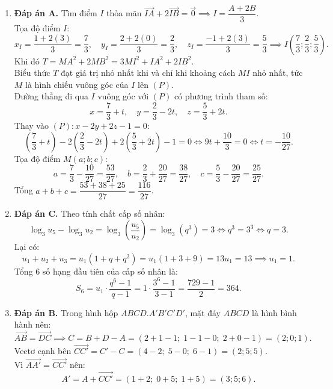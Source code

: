 \documentclass[12pt,a4paper]{article}
\begin{document}
\begin{enumerate}[label=\textbf{Câu \arabic*:}, leftmargin=*]
\item \textbf{Đáp án A.}
Tìm điểm $I$ thỏa mãn $\overrightarrow{IA} + 2\overrightarrow{IB} = \vec{0} \implies I = \dfrac{A + 2B}{3}$.\\
Tọa độ điểm $I$:
$$x_I = \dfrac{1 + 2(3)}{3} = \dfrac{7}{3},\quad y_I = \dfrac{2 + 2(0)}{3} = \dfrac{2}{3},\quad z_I = \dfrac{-1 + 2(3)}{3} = \dfrac{5}{3} \implies I\left(\dfrac{7}{3}; \dfrac{2}{3}; \dfrac{5}{3}\right).$$
Khi đó $T = MA^2 + 2MB^2 = 3MI^2 + IA^2 + 2IB^2$.\\
Biểu thức $T$ đạt giá trị nhỏ nhất khi và chỉ khi khoảng cách $MI$ nhỏ nhất, tức $M$ là hình chiếu vuông góc của $I$ lên $(P)$.\\
Đường thẳng đi qua $I$ vuông góc với $(P)$ có phương trình tham số:
$$x = \dfrac{7}{3} + t,\quad y = \dfrac{2}{3} - 2t,\quad z = \dfrac{5}{3} + 2t.$$
Thay vào $(P): x - 2y + 2z - 1 = 0$:
$$\left(\dfrac{7}{3} + t\right) - 2\left(\dfrac{2}{3} - 2t\right) + 2\left(\dfrac{5}{3} + 2t\right) - 1 = 0 \iff 9t + \dfrac{10}{3} = 0 \iff t = -\dfrac{10}{27}.$$
Tọa độ điểm $M(a; b; c)$:
$$a = \dfrac{7}{3} - \dfrac{10}{27} = \dfrac{53}{27},\quad b = \dfrac{2}{3} + \dfrac{20}{27} = \dfrac{38}{27},\quad c = \dfrac{5}{3} - \dfrac{20}{27} = \dfrac{25}{27}.$$
Tổng $a + b + c = \dfrac{53 + 38 + 25}{27} = \dfrac{116}{27}$.

\item \textbf{Đáp án C.}
Theo tính chất cấp số nhân:
$$\log_3 u_5 - \log_3 u_2 = \log_3 \left(\dfrac{u_5}{u_2}\right) = \log_3(q^3) = 3 \iff q^3 = 3^3 \iff q = 3.$$
Lại có:
$$u_1 + u_2 + u_3 = u_1(1 + q + q^2) = u_1(1 + 3 + 9) = 13u_1 = 13 \implies u_1 = 1.$$
Tổng 6 số hạng đầu tiên của cấp số nhân là:
$$S_6 = u_1 \cdot \dfrac{q^6 - 1}{q - 1} = 1 \cdot \dfrac{3^6 - 1}{3 - 1} = \dfrac{729 - 1}{2} = 364.$$

\item \textbf{Đáp án B.}
Trong hình hộp $ABCD.A'B'C'D'$, mặt đáy $ABCD$ là hình bình hành nên:
$$\overrightarrow{AB} = \overrightarrow{DC} \implies C = B + D - A = (2 + 1 - 1;\; 1 - 1 - 0;\; 2 + 0 - 1) = (2; 0; 1).$$
Vectơ cạnh bên $\overrightarrow{CC'} = C' - C = (4 - 2;\; 5 - 0;\; 6 - 1) = (2; 5; 5)$.\\
Vì $\overrightarrow{AA'} = \overrightarrow{CC'}$ nên:
$$A' = A + \overrightarrow{CC'} = (1 + 2;\; 0 + 5;\; 1 + 5) = (3; 5; 6).$$


\end{enumerate}
\end{document}
